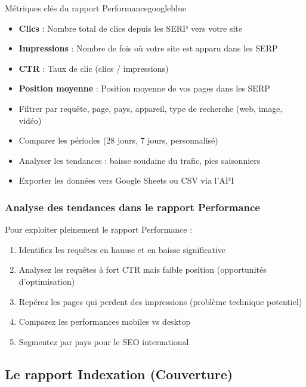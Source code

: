 \documentclass[12pt,a4paper,twoside]{report}
\begin{document}
\begin{mybox}{Métriques clés du rapport Performance}{googleblue}
\begin{itemize}
    \item \textbf{Clics} : Nombre total de clics depuis les SERP vers votre site
    \item \textbf{Impressions} : Nombre de fois où votre site est apparu dans les SERP
    \item \textbf{CTR} : Taux de clic (clics / impressions)
    \item \textbf{Position moyenne} : Position moyenne de vos pages dans les SERP
\end{itemize}
\end{mybox}

\begin{itemize}
    \item Filtrer par requête, page, pays, appareil, type de recherche (web, image, vidéo)
    \item Comparer les périodes (28 jours, 7 jours, personnalisé)
    \item Analyser les tendances : baisse soudaine du trafic, pics saisonniers
    \item Exporter les données vers Google Sheets ou CSV via l'API
\end{itemize}

\subsubsection{Analyse des tendances dans le rapport Performance}

Pour exploiter pleinement le rapport Performance :
\begin{enumerate}
    \item Identifiez les requêtes en hausse et en baisse significative
    \item Analysez les requêtes à fort CTR mais faible position (opportunités d'optimisation)
    \item Repérez les pages qui perdent des impressions (problème technique potentiel)
    \item Comparez les performances mobiles vs desktop
    \item Segmentez par pays pour le SEO international
\end{enumerate}

\subsection{Le rapport Indexation (Couverture)}
\end{document}
